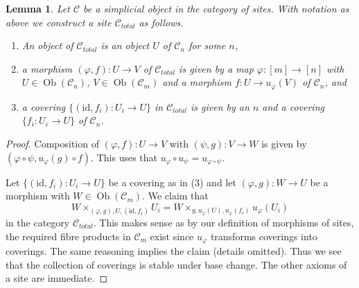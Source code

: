 \documentclass{stacks-project}
\theoremstyle{plain}
\newtheorem{lemma}[subsection]{Lemma}
\theoremstyle{definition}
\theoremstyle{remark}
\numberwithin{equation}{subsection}
\def\Ob{\mathop{\mathrm{Ob}}\nolimits}
\begin{document}
\begin{lemma}
\label{lemma-simplicial-site-site}
Let $\mathcal{C}$ be a simplicial object in the category of sites.
With notation as above we construct a site $\mathcal{C}_{total}$ as follows.
\begin{enumerate}
\item An object of $\mathcal{C}_{total}$ is an object $U$ of
$\mathcal{C}_n$ for some $n$,
\item a morphism $(\varphi, f) : U \to V$ of $\mathcal{C}_{total}$
is given by a map $\varphi : [m] \to [n]$ with
$U \in \Ob(\mathcal{C}_n)$, $V \in \Ob(\mathcal{C}_m)$
and a morphism $f : U \to u_\varphi(V)$ of $\mathcal{C}_n$, and
\item a covering $\{(\text{id}, f_i) :  U_i \to U\}$ in $\mathcal{C}_{total}$
is given by an $n$ and a covering $\{f_i : U_i \to U\}$
of $\mathcal{C}_n$.
\end{enumerate}
\end{lemma}

\begin{proof}
Composition of $(\varphi, f) : U \to V$ with $(\psi, g) : V \to W$
is given by $(\varphi \circ \psi, u_\varphi(g) \circ f)$.
This uses that $u_\varphi \circ u_\psi = u_{\varphi \circ \psi}$.

\medskip\noindent
Let $\{(\text{id}, f_i) :  U_i \to U\}$ be a covering as in (3)
and let $(\varphi, g) : W \to U$ be a morphism with
$W \in \Ob(\mathcal{C}_m)$. We claim that
$$
W \times_{(\varphi, g), U, (\text{id}, f_i)} U_i =
W \times_{g, u_\varphi(U), u_\varphi(f_i)} u_\varphi(U_i)
$$
in the category $\mathcal{C}_{total}$. This makes sense as by our
definition of morphisms of sites, the required fibre products
in $\mathcal{C}_m$ exist since $u_\varphi$ transforms coverings into
coverings. The same reasoning implies the claim (details omitted).
Thus we see that the collection of coverings is stable under base
change. The other axioms of a site are immediate.
\end{proof}
\end{document}
